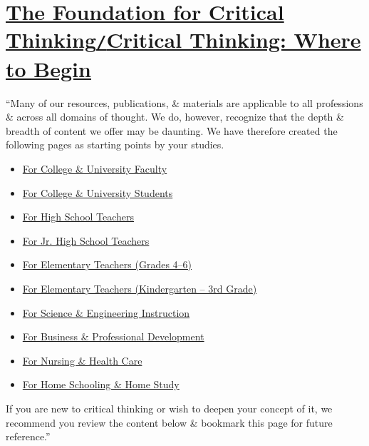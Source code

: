 \documentclass[oneside]{book}
\numberwithin{equation}{section}
\begin{document}
\section{\href{https://www.criticalthinking.org/pages/critical-thinking-where-to-begin/796}{The Foundation for Critical Thinking\texttt{/}Critical Thinking: Where to Begin}}
``Many of our resources, publications, \& materials are applicable to all professions \& across all domains of thought. We do, however, recognize that the depth \& breadth of content we offer may be daunting. We have therefore created the following pages as starting points by your studies.
\begin{itemize}
	\item \href{https://www.criticalthinking.org/starting/higher_ed.cfm}{For College \& University Faculty}
	\item \href{https://www.criticalthinking.org/starting/college_student.cfm}{For College \& University Students}
	\item \href{https://www.criticalthinking.org/starting/High_School.cfm}{For High School Teachers}
	\item \href{https://www.criticalthinking.org/starting/Jr_High.cfm}{For Jr. High School Teachers}
	\item \href{https://www.criticalthinking.org/starting/elem_Grades4-6.cfm}{For Elementary Teachers (Grades 4--6)}
	\item \href{https://www.criticalthinking.org/starting/elementary.cfm}{For Elementary Teachers (Kindergarten -- 3rd Grade)}
	\item \href{https://www.criticalthinking.org/starting/science_engineer.cfm}{For Science \& Engineering Instruction}
	\item \href{https://www.criticalthinking.org/starting/business.cfm}{For Business \& Professional Development}
	\item \href{https://www.criticalthinking.org/starting/nurse_health.cfm}{For Nursing \& Health Care}
	\item \href{https://www.criticalthinking.org/starting/home_school.cfm}{For Home Schooling \& Home Study}
\end{itemize}
If you are new to critical thinking or wish to deepen your concept of it, we recommend you review the content below \& bookmark this page for future reference.''
\end{document}
